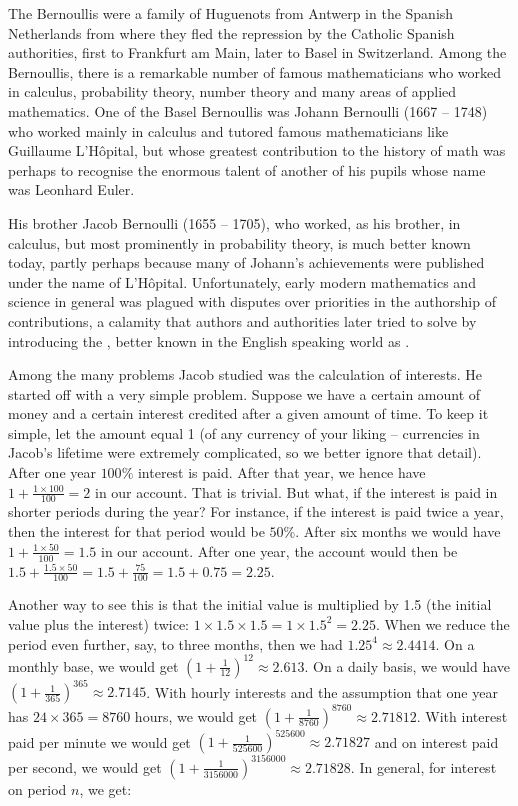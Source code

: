\documentclass[tikz]{scrreprt}
\begin{document}
The Bernoullis were a family of Huguenots from Antwerp
in the Spanish Netherlands from where they fled the repression
by the Catholic Spanish authorities, first to Frankfurt am Main,
later to Basel in Switzerland. Among the Bernoullis,
there is a remarkable number of famous mathematicians
who worked in calculus,
probability theory, number theory and many areas 
of applied mathematics. One of the Basel Bernoullis was
Johann Bernoulli (1667 -- 1748) who worked mainly
in calculus and tutored famous mathematicians like 
Guillaume L'Hôpital, but whose greatest contribution
to the history of math was perhaps to recognise 
the enormous talent of another of his pupils 
whose name was Leonhard Euler. 

His brother Jacob Bernoulli (1655 -- 1705),
who worked, as his brother, in calculus, but
most prominently in probability theory, 
is much better known today, partly perhaps
because many of Johann's achievements 
were published under the name of L'Hôpital.
Unfortunately, early modern mathematics 
and science in general was
plagued with disputes over priorities in the
authorship of contributions, a calamity
that authors and authorities later tried to
solve by introducing the ,
better known in the English speaking world as
.

Among the many problems Jacob studied was
the calculation of interests. He started off
with a very simple problem. Suppose we have
a certain amount of money and a certain interest
credited after a given amount of time. To keep it
simple, let the amount equal 1 (of any currency
of your liking -- currencies in Jacob's lifetime
were extremely complicated, so we better ignore
that detail). After one year $100\%$ interest is paid.
After that year, we hence have $1+\frac{1\times 100}{100} = 2$ 
in our account. That is trivial.
But what, if the interest is paid in shorter periods
during the year?
For instance, if the interest is paid twice a year,
then the interest for that period would be $50\%$.
After six months we would have $1+\frac{1\times 50}{100} = 1.5$
in our account. After one year, the account would then be
$1.5 + \frac{1.5\times 50}{100} = 1.5 + \frac{75}{100} = 1.5 + 0.75 = 2.25$.

Another way to see this is that the initial value 
is multiplied by 1.5 (the initial value plus the interest) twice:
$1 \times 1.5 \times 1.5 = 1 \times 1.5^2 = 2.25$.
When we reduce the period even further, say, to three months,
then we had $1.25^4 \approx 2.4414$. On a monthly base,
we would get $\left(1+\frac{1}{12}\right)^{12} \approx 2.613$.
On a daily basis, we would have 
$\left(1+\frac{1}{365}\right)^{365} \approx 2.7145$.
With hourly interests and the assumption
that one year has $24 \times 365 = 8760$ hours, 
we would get $\left(1+\frac{1}{8760}\right)^{8760} \approx 2.71812$.
With interest paid per minute we would get
$\left(1+\frac{1}{525600}\right)^{525600} \approx 2.71827$ and
on interest paid per second, we would get
$\left(1+\frac{1}{3156000}\right)^{3156000} \approx 2.71828$.
In general, for interest on period $n$, we get:
\end{document}
